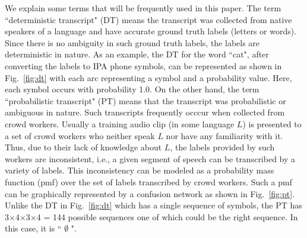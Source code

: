 \documentclass[a4paper]{article}
\begin{document}
We explain some terms that will be frequently used in this paper. The term ``deterministic transcript" (DT) means the transcript was collected from native speakers of a language and have accurate ground truth labels (letters or words). Since there is no ambiguity in such ground truth labels, the labels are deterministic in nature. As an example, the DT for the word ``cat", after converting the labels to IPA phone symbols, can be represented as shown in Fig.~\ref{fig:dt} with each arc representing a symbol and a probability value. Here, each symbol occurs with probability 1.0. On the other hand, the term ``probabilistic transcript" (PT) means that the transcript was probabilistic or ambiguous in nature. Such transcripts frequently occcur when collected from crowd workers. Usually a training audio clip (in some language $L$) is presented to a set of crowd workers who neither speak $L$ nor have any familiarity with it. Thus, due to their lack of knowledge about $L$, the labels provided by such workers are inconsistent, i.e., a given segment of speech can be transcribed by a variety of labels. This inconsistency can be modeled as a probability mass function (pmf) over the set of labels transcribed by crowd workers. Such a pmf can be graphically represented by a confusion network as shown in Fig.~\ref{fig:pt}. Unlike the DT in Fig.~\ref{fig:dt} which has a single sequence of symbols, the PT has 3$\times$4$\times$3$\times$4 = 144 possible sequences one of which could be the right sequence. In this case, it is `` \ipa{\ae} $\emptyset$ ".

\end{document}
